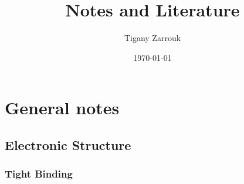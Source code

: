 \documentclass[11pt]{article}
\author{Tigany Zarrouk}
\date{\today}
\title{Notes and Literature}
\begin{document}
\maketitle
\tableofcontents



\section{General notes}
\label{sec:org6fcaa11}

\subsection{Electronic Structure}
\label{sec:org2fd7e1c}
\subsubsection{Tight Binding}
\label{sec:org4de4e49}
\end{document}
